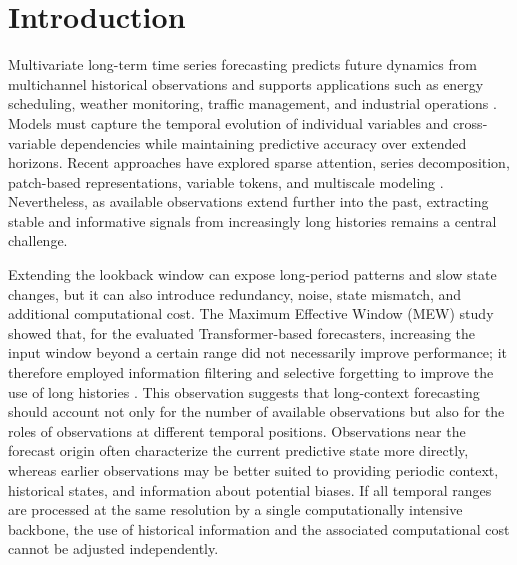 \section{Introduction}

Multivariate long-term time series forecasting predicts future dynamics from multichannel historical observations and supports applications such as energy scheduling, weather monitoring, traffic management, and industrial operations \citep{Lim2021DeepForecastSurvey}. Models must capture the temporal evolution of individual variables and cross-variable dependencies while maintaining predictive accuracy over extended horizons. Recent approaches have explored sparse attention, series decomposition, patch-based representations, variable tokens, and multiscale modeling \citep{Wen2023TransformerSurvey,Zhou2021Informer,Wu2021Autoformer,Nie2023PatchTST,Liu2024iTransformer,Wu2023TimesNet,Wang2024TimeMixer}. Nevertheless, as available observations extend further into the past, extracting stable and informative signals from increasingly long histories remains a central challenge.

Extending the lookback window can expose long-period patterns and slow state changes, but it can also introduce redundancy, noise, state mismatch, and additional computational cost. The Maximum Effective Window (MEW) study showed that, for the evaluated Transformer-based forecasters, increasing the input window beyond a certain range did not necessarily improve performance; it therefore employed information filtering and selective forgetting to improve the use of long histories \citep{Zhang2025MEW}. This observation suggests that long-context forecasting should account not only for the number of available observations but also for the roles of observations at different temporal positions. Observations near the forecast origin often characterize the current predictive state more directly, whereas earlier observations may be better suited to providing periodic context, historical states, and information about potential biases. If all temporal ranges are processed at the same resolution by a single computationally intensive backbone, the use of historical information and the associated computational cost cannot be adjusted independently.

